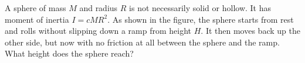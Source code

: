 A sphere of mass $M$ and radius $R$ is not necessarily solid or
hollow. It has moment of inertia $I = c MR^2$. As shown in the figure,
the sphere starts from rest and rolls without slipping down a ramp
from height $H$. It then moves back up the other side, but now with no
friction at all between the sphere and the ramp. What height does the
sphere reach?\answercheck
